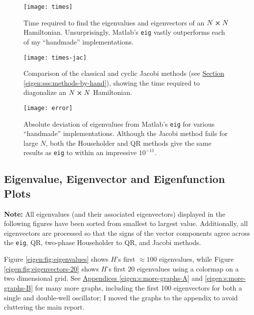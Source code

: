 \documentclass[11pt, a4paper]{article}
\begin{document}
\begin{figure}[hbt!]
	\centering
	\texttt{[image: times]}
	\caption{Time required to find the eigenvalues and eigenvectors of an $ N \cross N $ Hamiltonian. Unsurprisingly, Matlab's \texttt{eig} vastly outperforms each of my ``handmade'' implementations.}
	\label{eigen:fig:times}
\end{figure}



\begin{figure}[hbt!]
	\centering
	\texttt{[image: times-jac]}
	\vspace{-5mm}
	\caption{Comparison of the classical and cyclic Jacobi methods (see \hyperref[eigen:sss:methods-by-hand]{Section \ref{eigen:sss:methods-by-hand}}), showing the time required to diagonalize an $ N \cross N $ Hamiltonian.}
	\label{eigen:fig:times-jac}
\end{figure}


\begin{figure}[hbt!]
	\centering
	\texttt{[image: error]} \vspace{-4mm}
	\caption{Absolute deviation of eigenvalues from Matlab's \texttt{eig} for various ``handmade'' implementations. Although the Jacobi method fails for large $ N $, both the Householder and QR methods give the same results as \texttt{eig} to within an impressive $ 10^{-11} $.}
	\label{eigen:fig:error}
\end{figure}
\vspace{-7mm}

\subsection{Eigenvalue, Eigenvector and Eigenfunction Plots}
\textbf{Note:} All eigenvalues (and their associated eigenvectors) displayed in the following figures have been sorted from smallest to largest value. Additionally, all eigenvectors are processed so that the signs of the vector components agree across the \texttt{eig}, QR, two-phase Householder to QR, and Jacobi methods.

\vspace{1mm}
Figure \ref{eigen:fig:eigenvalues} shows $ H $'s first $ \approx 100 $ eigenvalues, while Figure \ref{eigen:fig:eigenvectors-20} shows $ H $'s first $ 20 $ eigenvalues using a colormap on a two dimensional grid. See \hyperref[eigen:s:more-graphs-A]{Appendices \ref{eigen:s:more-graphs-A}} and \ref{eigen:s:more-graphs-B} for many more graphs, including the first 100 eigenvectors for both a single and double-well oscillator; I moved the graphs to the appendix to avoid cluttering the main report.
\end{document}
